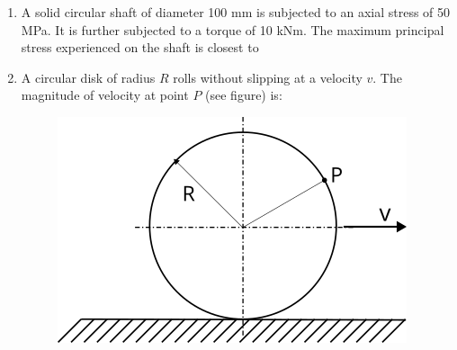 \documentclass[journal,12pt,onecolumn]{IEEEtran}
\begin{document}
\begin{enumerate}
    \item A solid circular shaft of diameter 100 mm is subjected to an axial stress of 50 MPa. It is further subjected to a torque of 10 kNm. The maximum principal stress experienced on the shaft is closest to\\

          \begin{enumerate}
          \end{enumerate}

    \item A circular disk of radius $R$ rolls without slipping at a velocity $v$. The magnitude of velocity at point $P$ (see figure) is:

          \begin{figure}[H]
              \centering
              \includegraphics[scale=0.7]{q33}
              \caption{}
              \label{q33}
          \end{figure}

          \begin{enumerate}
          \end{enumerate}


\end{enumerate}
\end{document}
